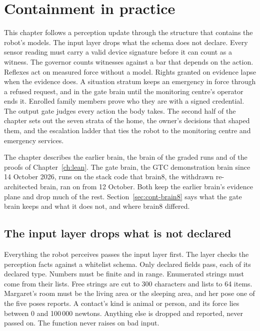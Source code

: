 \chapter{Containment in practice}\label{ch:containment}

This chapter follows a perception update through the structure that contains the robot's models. The
input layer drops what the schema does not declare. Every sensor reading must carry a valid device
signature before it can count as a witness. The governor counts witnesses against a bar that
depends on the action. Reflexes act on measured force without a model. Rights granted on evidence
lapse when the evidence does. A situation stratum keeps an emergency in force through a refused
request, and in the gate brain until the monitoring centre's operator ends it. Enrolled family members prove who they are with a signed credential. The output gate judges
every action the body takes. The second half of the chapter sets out the seven strata of the home,
the owner's decisions that shaped them, and the escalation ladder that ties the robot to the
monitoring centre and emergency services.

The chapter describes the earlier brain, the brain of the graded runs and of the proofs of
Chapter~\ref{ch:lean}. The gate brain, the GTC demonstration brain since 14 October 2026, runs on
the stack code that brain8, the withdrawn re-architected brain, ran on from 12 October. Both keep
the earlier brain's evidence plane and drop much of the rest. Section~\ref{sec:cont-brain8} says what
the gate brain keeps and what it does not, and where brain8 differed.

\section{The input layer drops what is not declared}\label{sec:cont-input}

Everything the robot perceives passes the input layer first. The layer checks the perception facts
against a whitelist schema. Only declared fields pass, each of its declared type. Numbers must be
finite and in range. Enumerated strings must come from their lists. Free strings are cut to 300
characters and lists to 64 items. Margaret's room must be the living area or the sleeping area, and
her pose one of the five poses  reports. A contact's kind is animal or person,
and its force lies between 0 and 100\,000 newtons. Anything else is dropped and reported, never passed
on. The function never raises on bad input.

